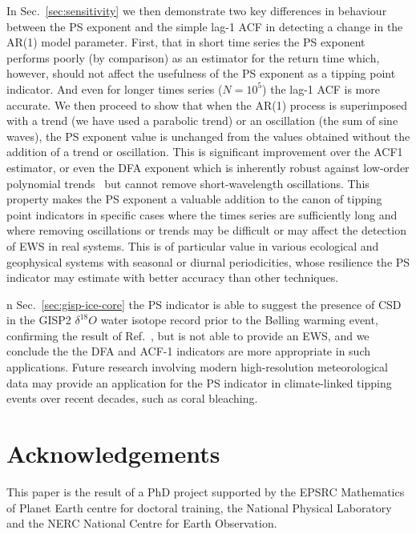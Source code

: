 \documentclass[10pt]{iopart}
\newcommand{\revision}[1]{}
\begin{document}
In Sec.~\ref{sec:sensitivity} we then demonstrate two key differences in behaviour between the PS exponent and the simple lag-1 ACF in detecting a change in the AR(1) model parameter. First, that in short time series the PS exponent performs poorly (by comparison) as an estimator for the return time which, however, should not affect the usefulness of the PS exponent as a tipping point indicator. And even for longer times series ($N=10^5$) the lag-1 ACF is more accurate. We then proceed to show that when the AR(1) process is superimposed with a trend (we have used a parabolic trend) or an oscillation (the sum of sine waves), the PS exponent value is unchanged from the values obtained without the addition of a trend or oscillation. This is significant improvement over the ACF1 estimator, or even the DFA exponent which is inherently robust against low-order polynomial trends~\cite{kantelhardt2001} but cannot remove short-wavelength oscillations. This property makes the PS exponent a valuable addition to the canon of tipping point indicators in specific cases where the times series are sufficiently long and where removing oscillations or trends may be difficult or may affect the detection of EWS in real systems. This is of particular value in various ecological and geophysical systems with seasonal or diurnal periodicities, whose resilience the PS indicator may estimate with better accuracy than other techniques. 

{\revision
In Sec.~\ref{sec:gisp-ice-core} the PS indicator is able to suggest the presence of CSD in the GISP2 $\delta^{18}O$ water isotope record prior to the B\o{}lling warming event, confirming the result of Ref.~\cite{lenton2012climate}, but is not able to provide an EWS, and we conclude the the DFA and ACF-1 indicators are more appropriate in such applications. Future research involving modern high-resolution meteorological data may provide an application for the PS indicator in climate-linked tipping events over recent decades, such as coral bleaching. }

%


\section*{Acknowledgements}
\label{sec:Acknowledgements}

This paper is the result of a PhD project supported by the EPSRC Mathematics of Planet Earth centre for doctoral training, the National Physical Laboratory and the NERC National Centre for Earth Observation.


\vspace{0.5cm}


\end{document}
